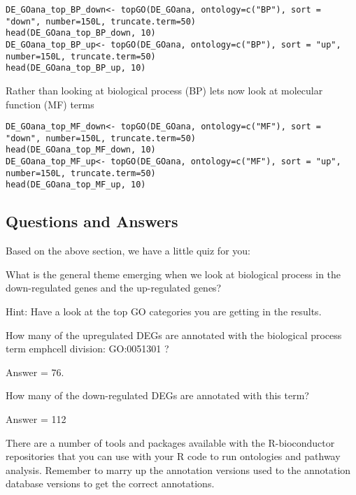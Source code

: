 \begin{steps}
\begin{lstlisting}
DE_GOana_top_BP_down<- topGO(DE_GOana, ontology=c("BP"), sort = "down", number=150L, truncate.term=50)
head(DE_GOana_top_BP_down, 10)
DE_GOana_top_BP_up<- topGO(DE_GOana, ontology=c("BP"), sort = "up", number=150L, truncate.term=50)
head(DE_GOana_top_BP_up, 10)
\end{lstlisting}
\end{steps}

Rather than looking at biological process (BP) let\’s now look at molecular function (MF) terms

\begin{steps}
\begin{lstlisting}
DE_GOana_top_MF_down<- topGO(DE_GOana, ontology=c("MF"), sort = "down", number=150L, truncate.term=50)
head(DE_GOana_top_MF_down, 10)
DE_GOana_top_MF_up<- topGO(DE_GOana, ontology=c("MF"), sort = "up", number=150L, truncate.term=50)
head(DE_GOana_top_MF_up, 10)
\end{lstlisting}
\end{steps}

\subsection{Questions and Answers}
Based on the above section, we have a little quiz for you:


\begin{questions}
What is the general theme emerging when we look at biological process in the down-regulated genes and the up-regulated genes?
\begin{answer}
Hint: Have a look at the top GO categories you are getting in the results. 
\end{answer}

How many of the upregulated DEGs are annotated with the biological process term emph{cell division: GO:0051301} ? 
\begin{answer}
Answer = 76. 
\end{answer}
How many of the down-regulated DEGs are annotated with this term? 
\begin{answer}
Answer = 112
\end{answer}
\end{questions}

\begin{note}There are a number of tools and packages available with the R-bioconductor repositories that you can use with your R code to run ontologies and pathway analysis. Remember to marry up the annotation versions used to the annotation database versions to get the correct annotations.
\end{note}

